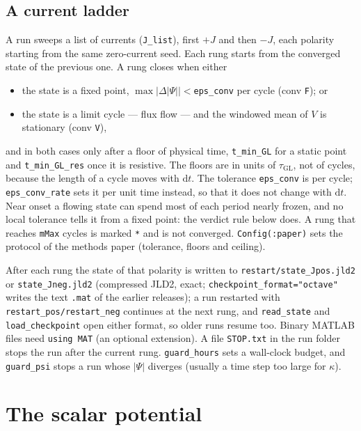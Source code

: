 \documentclass[11pt,a4paper]{article}
\newcommand{\tGL}{\tau_{\mathrm{GL}}}
\newcommand{\code}[1]{\texttt{#1}}
\begin{document}
\subsection{A current ladder}

A run sweeps a list of currents (\code{J\_list}), first $+J$ and then $-J$,
each polarity starting from the same zero-current seed. Each rung starts
from the converged state of the previous one. A rung closes when either
\begin{itemize}
\item the state is a fixed point, $\max|\Delta|\Psi||<$\code{eps\_conv}
  per cycle (conv \code{F}); or
\item the state is a limit cycle --- flux flow --- and the windowed mean of
  $V$ is stationary (conv \code{V}),
\end{itemize}
and in both cases only after a floor of physical time, \code{t\_min\_GL}
for a static point and \code{t\_min\_GL\_res} once it is resistive. The
floors are in units of $\tGL$, not of cycles, because the length of a cycle
moves with $\mathrm dt$. The tolerance \code{eps\_conv} is per cycle;
\code{eps\_conv\_rate} sets it per unit time instead, so that it does not
change with $\mathrm dt$. Near onset a flowing state can spend most of each
period nearly frozen, and no local tolerance tells it from a fixed point:
the verdict rule below does. A rung that reaches \code{mMax} cycles is
marked \code{*} and is not converged. \code{Config(:paper)} sets the
protocol of the methods paper (tolerance, floors and ceiling).

After each rung the state of that polarity is written to
\code{restart/state\_Jpos.jld2} or \code{state\_Jneg.jld2} (compressed JLD2, exact;
\code{checkpoint\_format="octave"} writes the text \code{.mat} of the earlier releases); a run restarted with \code{restart\_pos/restart\_neg} continues at the next
rung, and \code{read\_state} and \code{load\_checkpoint} open either format, so older
runs resume too. Binary MATLAB files need \code{using MAT} (an optional extension). A file
\code{STOP.txt} in the run folder stops the run after the current rung.
\code{guard\_hours} sets a wall-clock budget, and \code{guard\_psi} stops a
run whose $|\Psi|$ diverges (usually a time step too large for $\kappa$).

\section{The scalar potential}
\end{document}

